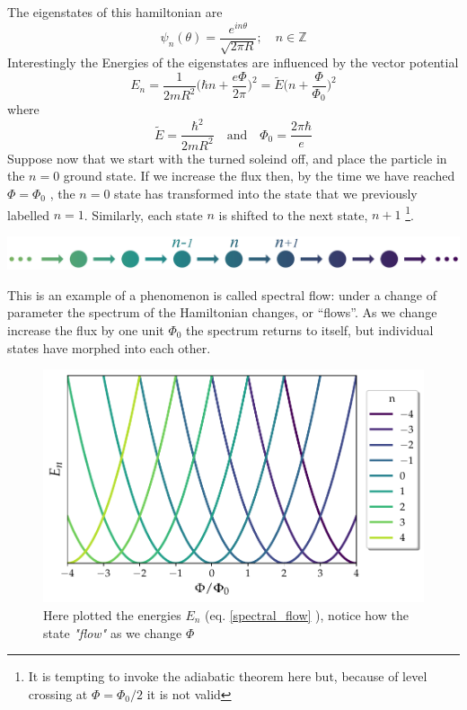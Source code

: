         The eigenstates of this hamiltonian are 
        \[
        \psi_n(\theta)=\frac {e^{in\theta}} {\sqrt{2\pi R}}; \quad n\in \mathbb Z
        \]
        Interestingly the Energies of the eigenstates are influenced by the vector potential
        \begin{equation} \label{spectral_flow}
                E_n=\frac 1{2mR^2}\bigg(\hbar n+ \frac{e\Phi}{2\pi}\bigg)^2=\tilde E\bigg(n+\frac{\Phi}{\Phi_0}\bigg)^2
        \end{equation}
        where
        \[
        \tilde E=\frac{\hbar^2}{2mR^2} \quad \textrm{and} \quad \Phi_0=\frac{2\pi \hbar}e
        \]
        Suppose now that we start with the turned soleind off, and place the particle in the $n=0$ ground
        state. If we increase the flux then, by the time we have reached $\Phi=\Phi_0$ , the $n=0$ state
        has transformed into the state that we previously labelled $n = 1$. Similarly, each state
        $n$ is shifted to the next state, $n + 1$ \footnote{It is tempting to invoke the adiabatic theorem
        here but, because of level crossing at $\Phi=\Phi_0/2$ it is not valid}.\\
        \begin{minipage}{\textwidth}
                    \includegraphics[width=1\linewidth]{Immagini/topo/flow.pdf}
        \end{minipage}
        This is an example of a phenomenon is called spectral flow: under a change of parameter
        the spectrum of the Hamiltonian changes, or “flows”. As we change increase the flux
        by one unit  $\Phi_0$ the spectrum returns to itself, but individual states have morphed into
        each other. \cite{tong2016lectures}
        \begin{figure}[h]
            \includegraphics[width=\linewidth]{Immagini/topo/spectral_flow.pdf}
            \caption{Here plotted the energies $E_n$ (eq. \ref{spectral_flow} ), notice how the state \textit{"flow"} as we change $\Phi$}
        \end{figure}
